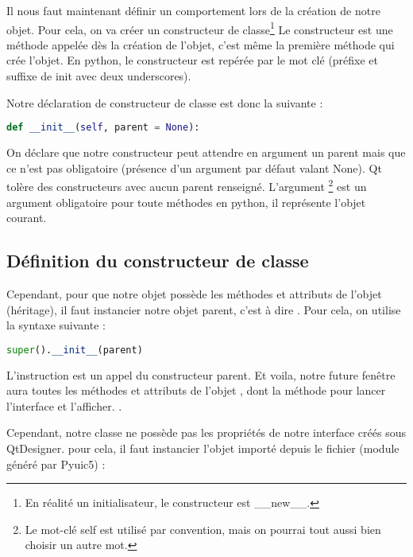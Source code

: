 \documentclass[12pt]{report}    %
\begin{document}
Il nous faut maintenant définir un comportement lors de la création de notre objet. \newline
Pour cela, on va créer un constructeur de classe\footnote{En réalité un initialisateur, le constructeur est \_\_new\_\_.}
Le constructeur est une méthode appelée dès la création de l'objet, c'est même la première méthode qui crée l'objet. \newline
En python, le constructeur est repérée par le mot clé  (préfixe et suffixe de init avec deux underscores).

Notre déclaration de constructeur de classe est donc la suivante : 

\begin{lstlisting}[language=Python]
    def __init__(self, parent = None):
\end{lstlisting}

On déclare que notre constructeur peut attendre en argument un parent mais que ce n'est pas obligatoire (présence d'un argument par défaut valant None). \newline Qt tolère des constructeurs avec aucun parent renseigné. \newline
L'argument \footnote{Le mot-clé self est utilisé par convention, mais on pourrai tout aussi bien choisir un autre mot.} est un argument obligatoire pour toute méthodes en python, il représente l'objet courant. 

\subsection{Définition du constructeur de classe}

Cependant, pour que notre objet possède les méthodes et attributs de l'objet  (héritage), il faut instancier notre objet parent, c'est à dire .
Pour cela, on utilise la syntaxe suivante : 
\begin{lstlisting}[language=Python]
        super().__init__(parent)
\end{lstlisting}
L'instruction  est un appel du constructeur parent. \newline
Et voila, notre future fenêtre aura toutes les méthodes et attributs de l'objet , dont la méthode pour lancer l'interface et l'afficher. \newline.

Cependant, notre classe  ne possède pas les propriétés de notre interface créés sous QtDesigner. pour cela, il faut instancier l'objet importé depuis le fichier  (module généré par Pyuic5) : 
\end{document}
